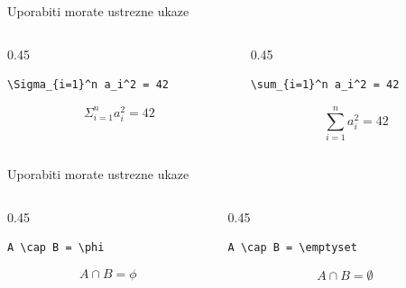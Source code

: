 \documentclass[aspectratio=169]{beamer}
\begin{document}
\begin{frame}[fragile]{Uporabiti morate ustrezne ukaze}
  \begin{columns}[t]
    \begin{column}{0.45\textwidth}
      \begin{slaboenv}
        \begin{verbatim}
\Sigma_{i=1}^n a_i^2 = 42
        \end{verbatim}
        \[ \Sigma_{i=1}^n a_i^2 = 42 \]
      \end{slaboenv}
    \end{column}
    \begin{column}{0.45\textwidth}
      \begin{dobroenv}
        \begin{verbatim}
\sum_{i=1}^n a_i^2 = 42
        \end{verbatim}
        \[ \sum_{i=1}^n a_i^2 = 42 \]
      \end{dobroenv}
    \end{column}
  \end{columns}
\end{frame}

\begin{frame}[fragile]{Uporabiti morate ustrezne ukaze}
  \begin{columns}[t]
    \begin{column}{0.45\textwidth}
      \begin{slaboenv}
        \begin{verbatim}
A \cap B = \phi
        \end{verbatim}
        \[ A \cap B = \phi \]
      \end{slaboenv}
    \end{column}
    \begin{column}{0.45\textwidth}
      \begin{dobroenv}
        \begin{verbatim}
A \cap B = \emptyset
        \end{verbatim}
        \[ A \cap B = \emptyset \]
      \end{dobroenv}
    \end{column}
  \end{columns}
\end{frame}
\end{document}
